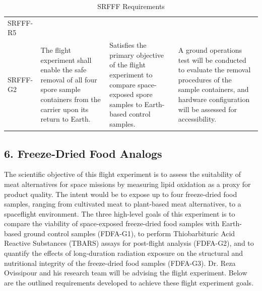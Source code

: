 \documentclass[conf]{new-aiaa}
\begin{document}
\begin{table}[H]
\begin{tabularx}{\textwidth}{@{}>{\raggedright\arraybackslash}m{2.4cm}YYY@{}}
    SRFFF-R5\\SRFFF-G2 &
    The flight experiment shall enable the safe removal of all four spore sample containers from the carrier upon its return to Earth. &
    Satisfies the primary objective of the flight experiment to compare space-exposed spore samples to Earth-based control samples. &
    A ground operations test will be conducted to evaluate the removal procedures of the sample containers, and hardware configuration will be assessed for accessibility. \\
    \bottomrule
    \end{tabularx}
    \caption{SRFFF Requirements}
    \label{tab:srfff_requirements}
\end{table}


\clearpage
\subsection{6. Freeze-Dried Food Analogs}

The scientific objective of this flight experiment is to assess the suitability of meat alternatives for space missions by measuring lipid oxidation as a proxy for product quality. The intent would be to expose up to four freeze-dried food samples, ranging from cultivated meat to plant-based meat alternatives, to a spaceflight environment. The three high-level goals of this experiment is to compare the viability of space-exposed freeze-dried food samples with Earth-based ground control samples (FDFA-G1), to perform Thiobarbituric Acid Reactive Substances (TBARS) assays for post-flight analysis (FDFA-G2), and to quantify the effects of long-duration radiation exposure on the structural and nutritional integrity of the freeze-dried food samples (FDFA-G3). Dr. Reza Ovissipour and his research team will be advising the flight experiment. Below are the outlined requirements developed to achieve these flight experiment goals. \cite{thilakarathna-srfff}
\end{document}
